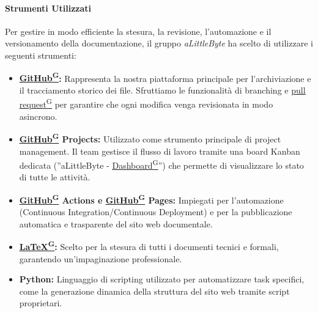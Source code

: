\documentclass[a4paper,12pt]{article}
\providecommand{\glslink}[2]{\href{https://alittlebyte-19.github.io/Documentazione/glossario.html\#gls-#1}{\underline{#2}\textsuperscript{\scriptsize G}}}
\begin{document}
\paragraph{Strumenti Utilizzati}
Per gestire in modo efficiente la stesura, la revisione, l'automazione e il versionamento della documentazione, il gruppo \textit{aLittleByte} ha scelto di utilizzare i seguenti strumenti:
\begin{itemize}
    \item \textbf{\glslink{github}{GitHub}:} Rappresenta la nostra piattaforma principale per l'archiviazione e il tracciamento storico dei file. Sfruttiamo le funzionalità di branching e \glslink{pull-request}{pull request} per garantire che ogni modifica venga revisionata in modo asincrono.
    \item \textbf{\glslink{github}{GitHub} Projects:} Utilizzato come strumento principale di project management. Il team gestisce il flusso di lavoro tramite una board Kanban dedicata (''aLittleByte - \glslink{dashboard}{Dashboard}'') che permette di visualizzare lo stato di tutte le attività.
    \item \textbf{\glslink{github}{GitHub} Actions e \glslink{github}{GitHub} Pages:} Impiegati per l'automazione (Continuous Integration/Continuous Deployment) e per la pubblicazione automatica e trasparente del sito web documentale.
    \item \textbf{\glslink{latex}{LaTeX}:} Scelto per la stesura di tutti i documenti tecnici e formali, garantendo un'impaginazione professionale.
    \item \textbf{Python:} Linguaggio di scripting utilizzato per automatizzare task specifici, come la generazione dinamica della struttura del sito web tramite script proprietari.
\end{itemize}
\end{document}
